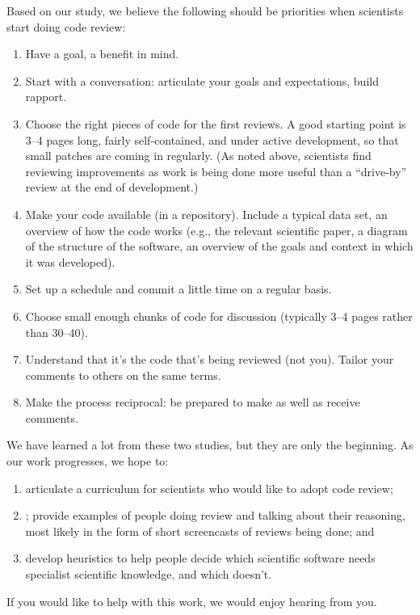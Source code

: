 \documentclass[10pt,twocolumn]{article}
\begin{document}
Based on our study,
we believe the following should be priorities when scientists start doing code review:

\begin{enumerate}

\item Have a goal, a benefit in mind.

\item Start with a conversation:
articulate your goals and expectations, build rapport.

\item Choose the right pieces of code for the first reviews.
A good starting point is 3--4 pages long,
fairly self-contained,
and under active development,
so that small patches are coming in regularly.
(As noted above,
scientists find reviewing improvements as work is being done
more useful than a ``drive-by'' review at the end of development.)

\item Make your code available (in a repository).
Include a typical data set, an overview of how the code works
(e.g.,
the relevant scientific paper,
a diagram of the structure of the software,
an overview of the goals and context in which it was developed).

\item Set up a schedule and commit a little time on a regular basis.

\item Choose small enough chunks of code for discussion (typically 3--4 pages rather than 30--40).

\item Understand that it's the code that's being reviewed (not you).
Tailor your comments to others on the same terms.

\item Make the process reciprocal:
be prepared to make as well as receive comments.

\end{enumerate}

We have learned a lot from these two studies,
but they are only the beginning.
As our work progresses,
we hope to:

\begin{enumerate}

\item
articulate a curriculum for scientists who would like to adopt code review;

\item;
provide examples of people doing review and talking about their reasoning,
most likely in the form of short screencasts of reviews being done;
and

\item
develop heuristics to help people decide
which scientific software needs specialist scientific knowledge,
and which doesn't.

\end{enumerate}

If you would like to help with this work,
we would enjoy hearing from you.

{\small


}
\end{document}

